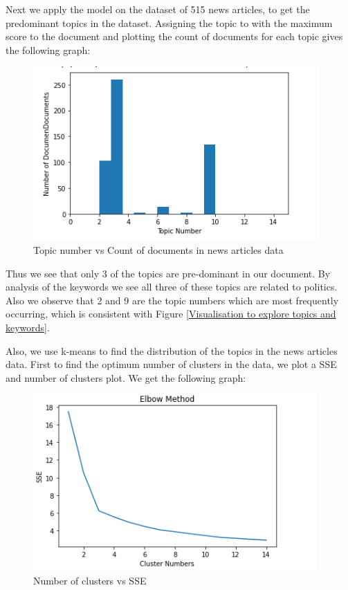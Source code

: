 \documentclass{article}
\begin{document}
Next we apply the model on the dataset of 515 news articles, to get the predominant topics in the dataset. Assigning the topic to with the maximum score to the document and plotting the count of documents for each topic gives the following graph:

\begin{figure}[H]
    \centering
    \includegraphics[scale=1]{dist.PNG}
    \caption{Topic number vs Count of documents in news articles data}
    \label{Topic number vs Count of documents in news articles data}
\end{figure}

Thus we see that only 3 of the topics are pre-dominant in our document. By analysis of the keywords we see all three of these topics are related to politics. Also we observe that 2 and 9 are the topic numbers which are most  frequently occurring, which is consistent with Figure \ref{Visualisation to explore topics and keywords}. 

Also, we use k-means to find the distribution of the topics in the news articles data. First to find the optimum number of clusters in the data, we plot a SSE and number of clusters plot. We get the following graph:
\begin{figure}[H]
    \centering
    \includegraphics{sse.PNG}
    \caption{Number of clusters vs SSE}
    \label{Number of clusters vs SSE}
\end{figure}
\end{document}
